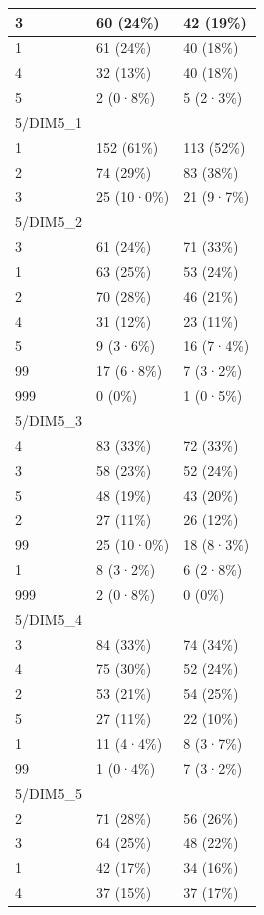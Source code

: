 \documentclass[
]{book}
\begin{document}
\begin{tabular}{l|l|l}
\hline
3 & 60 (24\%) & 42 (19\%)\\
\hline
1 & 61 (24\%) & 40 (18\%)\\
\hline
4 & 32 (13\%) & 40 (18\%)\\
\hline
5 & 2 (0·8\%) & 5 (2·3\%)\\
\hline
5/DIM5\_1 &  & \\
\hline
1 & 152 (61\%) & 113 (52\%)\\
\hline
2 & 74 (29\%) & 83 (38\%)\\
\hline
3 & 25 (10·0\%) & 21 (9·7\%)\\
\hline
5/DIM5\_2 &  & \\
\hline
3 & 61 (24\%) & 71 (33\%)\\
\hline
1 & 63 (25\%) & 53 (24\%)\\
\hline
2 & 70 (28\%) & 46 (21\%)\\
\hline
4 & 31 (12\%) & 23 (11\%)\\
\hline
5 & 9 (3·6\%) & 16 (7·4\%)\\
\hline
99 & 17 (6·8\%) & 7 (3·2\%)\\
\hline
999 & 0 (0\%) & 1 (0·5\%)\\
\hline
5/DIM5\_3 &  & \\
\hline
4 & 83 (33\%) & 72 (33\%)\\
\hline
3 & 58 (23\%) & 52 (24\%)\\
\hline
5 & 48 (19\%) & 43 (20\%)\\
\hline
2 & 27 (11\%) & 26 (12\%)\\
\hline
99 & 25 (10·0\%) & 18 (8·3\%)\\
\hline
1 & 8 (3·2\%) & 6 (2·8\%)\\
\hline
999 & 2 (0·8\%) & 0 (0\%)\\
\hline
5/DIM5\_4 &  & \\
\hline
3 & 84 (33\%) & 74 (34\%)\\
\hline
4 & 75 (30\%) & 52 (24\%)\\
\hline
2 & 53 (21\%) & 54 (25\%)\\
\hline
5 & 27 (11\%) & 22 (10\%)\\
\hline
1 & 11 (4·4\%) & 8 (3·7\%)\\
\hline
99 & 1 (0·4\%) & 7 (3·2\%)\\
\hline
5/DIM5\_5 &  & \\
\hline
2 & 71 (28\%) & 56 (26\%)\\
\hline
3 & 64 (25\%) & 48 (22\%)\\
\hline
1 & 42 (17\%) & 34 (16\%)\\
\hline
4 & 37 (15\%) & 37 (17\%)\\

\end{tabular}
\end{document}
